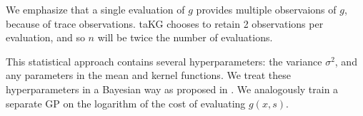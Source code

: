 \documentclass[letterpaper]{article}
\numberwithin{equation}{section}
\begin{document}
We emphasize that a single evaluation of $g$ provides multiple observaions of $g$, because of trace observations.  taKG chooses to retain 2 observations per evaluation, and so $n$ will be twice the number of evaluations.


This statistical approach contains several hyperparameters: the variance $\sigma^2$, and any parameters in the mean and kernel functions.  We treat these hyperparameters in a Bayesian way as proposed in \citet{snoek2012practical}. We analogously train a separate GP on the logarithm of the cost of evaluating $g(x,s)$. 
\end{document}
